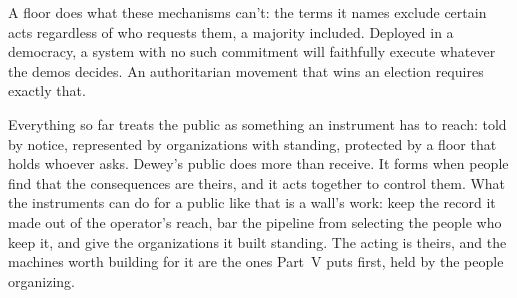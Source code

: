 A floor does what these mechanisms can't: the terms it names exclude certain acts regardless of who requests them, a majority included. Deployed in a democracy, a system with no such commitment will faithfully execute whatever the demos decides. An authoritarian movement that wins an election requires exactly that.

Everything so far treats the public as something an instrument has to reach: told by notice, represented by organizations with standing, protected by a floor that holds whoever asks. Dewey's public does more than receive. It forms when people find that the consequences are theirs, and it acts together to control them.
What the instruments can do for a public like that is a wall's work: keep the record it made out of the operator's reach, bar the pipeline from selecting the people who keep it, and give the organizations it built standing. The acting is theirs, and the machines worth building for it are the ones Part~V puts first, held by the people organizing.
